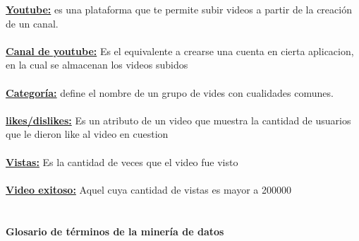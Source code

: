             \hfill \break
            \underline{\textbf{Youtube:}} es una plataforma que te permite subir videos a
            partir de la creación de un canal.\\\\
            \underline{\textbf{Canal de youtube:}} Es el equivalente a crearse una
            cuenta en cierta aplicacion, en la cual se almacenan los videos subidos\\\\
            \underline{\textbf{Categoría:}} define el nombre de un grupo de vides con
            cualidades comunes.\\\\
            \underline{\textbf{likes/dislikes:}} Es un atributo de un video que muestra la
            cantidad de usuarios que le dieron like al video en cuestion\\\\
            \underline{\textbf{Vistas:}} Es la cantidad de veces que el video fue
            visto\\\\
            \underline{\textbf{Video exitoso:}} Aquel cuya cantidad de vistas
            es mayor a 200000 \\\\

        \paragraph{Glosario de términos de la minería de datos}


